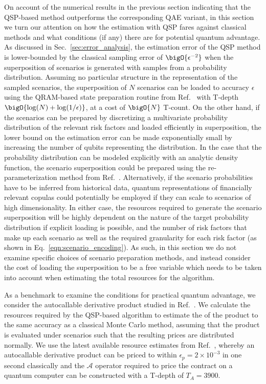 \begin{enumerate}
On account of the numerical results in the previous section indicating that the QSP-based \var{} method outperforms the corresponding QAE variant, in this section we turn our attention on how the \var{} estimation with QSP fares against classical methods and what conditions (if any) there are for potential quantum advantage.
As discussed in Sec.~\ref{sec:error_analysis}, the estimation error of the QSP method is lower-bounded by the classical sampling error of $\bigO{\epsilon^{-2}}$ when the superposition of scenarios is generated with samples from a probability distribution.
Assuming no particular structure in the representation of the sampled scenarios, the superposition of $N$ scenarios can be loaded to accuracy $\epsilon$ using the QRAM-based state preparation routine from Ref.~\cite{clader2022quantum} with T-depth $\bigO{\log(N) +
\log(1/\epsilon)}$, at a cost of $\bigO{N}$ T-count.
On the other hand, if the scenarios can be prepared by discretizing a multivariate probability distribution of the relevant risk factors and loaded efficiently in superposition, the lower bound on the \var{} estimation error can be made exponentially small by increasing the number of qubits representing the distribution.
In the case that the probability distribution can be modeled explicitly with an analytic density function, the scenario superposition could be prepared using the re-parameterization method from Ref.~\cite{chakrabarti2021threshold}.
Alternatively, if the scenario probabilities have to be inferred from historical data, quantum representations of financially relevant copulas \cite{milek2020quantum, zhu2022copula} could potentially be employed if they can scale to scenarios of high dimensionality.
In either case, the resources required to generate the scenario superposition will be highly dependent on the nature of the target probability distribution if explicit loading is possible, and the number of risk factors that make up each scenario as well as the required granularity for each risk factor (as shown in Eq.~\eqref{eqn:scenario_encoding}).
As such, in this section we do not examine specific choices of scenario preparation methods, and instead consider the cost of loading the superposition to be a free variable which needs to be taken into account when estimating the total resources for the algorithm.

As a benchmark to examine the conditions for practical quantum advantage, we consider the autocallable derivative product studied in Ref.~\cite{chakrabarti2021threshold}.
We calculate the resources required by the QSP-based \var{} algorithm to estimate the \var{} of the product to the same accuracy as a classical Monte Carlo method, assuming that the product is evaluated under scenarios such that the resulting prices are distributed normally.
We use the latest available resource estimates from Ref.~\cite{stamatopoulos2023derivative}, whereby an autocallable derivative product can be priced to within $\epsilon_p=2\times 10^{-3}$ in one second classically and the $\mathcal{A}$ operator required to price the contract on a quantum computer can be constructed with a T-depth of $T_A = 3900$.


\end{enumerate}
